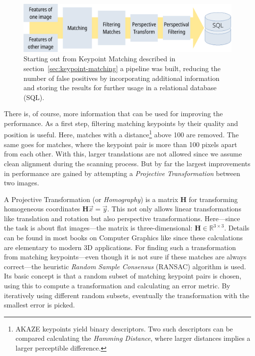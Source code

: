 \documentclass{ltjarticle}
\begin{document}
\begin{figure}
    \centering
    \includegraphics[width=\textwidth]{pipeline.pdf}
    \caption[Full processing pipeline]{Starting out from Keypoint Matching described in section~\ref{sec:keypoint-matching} a pipeline was built, reducing the number of false positives by incorporating additional information and storing the results for further usage in a relational database (SQL).}
    \label{fig:pipeline}
\end{figure}

There is, of course, more information that can be used for improving the performance. As a first step, filtering matching keypoints by their quality and position is useful. Here, matches with a distance\footnote{AKAZE keypoints yield binary descriptors. Two such descriptors can be compared calculating the \emph{Hamming Distance}, where larger distances implies a larger perceptible difference.} above 100 are removed. The same goes for matches, where the keypoint pair is more than 100 pixels apart from each other. With this, larger translations are not allowed since we assume clean alignment during the scanning process. But by far the largest improvements in performance are gained by attempting a \emph{Projective Transformation} between two images.

A Projective Transformation (or \emph{Homography}) is a matrix $\mathbf{H}$ for transforming homogeneous coordinates $\mathbf{H}\vec{x} = \vec{y}$. This not only allows linear transformations like translation and rotation but also perspective transformations. Here---since the task is about flat images---the matrix is three-dimensional: $\mathbf{H} \in \mathbb{R}^{3 \times 3}$. Details can be found in most books on Computer Graphics like \cite{marschner2015fundamentals} since these calculations are elementary to modern 3D applications. For finding such a transformation from matching keypoints---even though it is not sure if these matches are always correct---the heuristic \emph{Random Sample Consensus} (RANSAC) algorithm is used.\cite{fischler1981random} Its basic concept is that a random subset of matching keypoint pairs is chosen, using this to compute a transformation and calculating an error metric. By iteratively using different random subsets, eventually the transformation with the smallest error is picked. 
\end{document}
